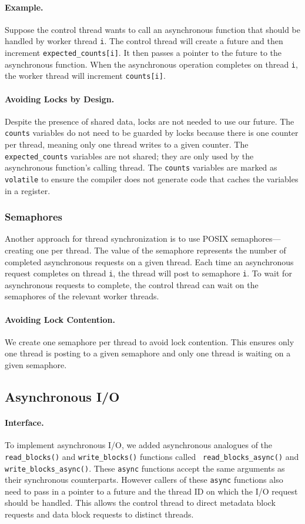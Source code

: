 \paragraph{Example.}
Suppose the control thread wants to call an asynchronous function that should
be handled by worker thread {\tt i}. The control thread will create a future
and then increment {\tt expected\_counts[i]}. It then passes a pointer to the
future to the asynchronous function. When the asynchronous operation completes
on thread {\tt i}, the worker thread will increment {\tt counts[i]}.

\paragraph{Avoiding Locks by Design.}
Despite the presence of shared data, locks are not needed to use our future.
The {\tt counts} variables do not need to be guarded by locks because there is
one counter per thread, meaning only one thread writes to a given counter. The
{\tt expected\_counts} variables are not shared; they are only used by the
asynchronous function's calling thread. The {\tt counts} variables are marked
as {\tt volatile} to ensure the compiler does not generate code that caches the
variables in a register.

\subsubsection{Semaphores}
Another approach for thread synchronization is to use POSIX
semaphores---creating one per thread. The value of the semaphore represents the
number of completed asynchronous requests on a given thread. Each time an
asynchronous request completes on thread {\tt i}, the thread will post to
semaphore {\tt i}. To wait for asynchronous requests to complete, the control
thread can wait on the semaphores of the relevant worker threads.

\paragraph{Avoiding Lock Contention.} We create one semaphore per thread to
avoid lock contention. This ensures only one thread is posting to a given
semaphore and only one thread is waiting on a given semaphore.

\subsection{Asynchronous I/O}
\paragraph{Interface.}
To implement asynchronous I/O, we added asynchronous analogues of the {\tt
read\_blocks()} and {\tt write\_blocks()} functions called {\tt
read\_blocks\_async()} and {\tt write\_blocks\_async()}. These {\tt async}
functions accept the same arguments as their synchronous counterparts. However
callers of these {\tt async} functions also need to pass in a pointer to a
future and the thread ID on which the I/O request should be handled. This
allows the control thread to direct metadata block requests and data block
requests to distinct threads.

